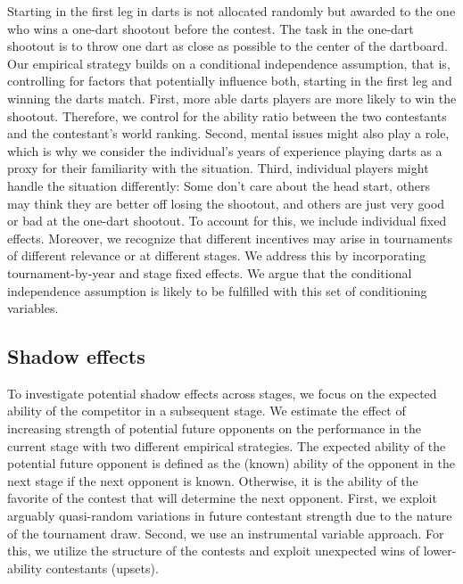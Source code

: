 \documentclass[11pt,a4paper]{article}
\begin{document}
Starting in the first leg in darts is not allocated randomly but awarded to the one who wins a one-dart shootout before the contest. The task in the one-dart shootout is to throw one dart as close as possible to the center of the dartboard. Our empirical strategy builds on a conditional independence assumption, that is, controlling for factors that potentially influence both, starting in the first leg and winning the darts match. First, more able darts players are more likely to win the shootout. Therefore, we control for the ability ratio between the two contestants and the contestant's world ranking. Second, mental issues might also play a role, which is why we consider the individual's years of experience playing darts as a proxy for their familiarity with the situation. Third, individual players might handle the situation differently: Some don't care about the head start, others may think they are better off losing the shootout, and others are just very good or bad at the one-dart shootout. To account for this, we include individual fixed effects. Moreover, we recognize that different incentives may arise in tournaments of different relevance or at different stages. We address this by incorporating tournament-by-year and stage fixed effects. We argue that the conditional independence assumption is likely to be fulfilled with this set of conditioning variables. \par

\subsection{Shadow effects}

To investigate potential shadow effects across stages, we focus on the expected ability of the competitor in a subsequent stage. We estimate the effect of increasing strength of potential future opponents on the performance in the current stage with two different empirical strategies. The expected ability of the potential future opponent is defined as the (known) ability of the opponent in the next stage if the next opponent is known. Otherwise, it is the ability of the favorite of the contest that will determine the next opponent.
First, we exploit arguably quasi-random variations in future contestant strength due to the nature of the tournament draw. Second, we use an instrumental variable approach. For this, we utilize the structure of the contests and exploit unexpected wins of lower-ability contestants (upsets).\par 
\end{document}
